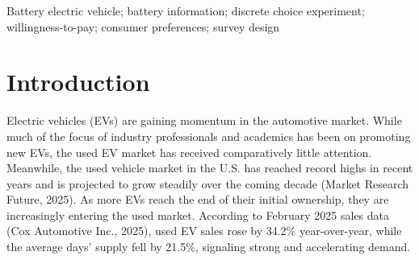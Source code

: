 \documentclass[a4paper,fleqn]{cas-sc}   %
\begin{document}
\begin{abstract}
This discrete choice experiment (DCE) aimed at understanding consumer preferences and willingness to pay for battery health information in the used battery electric vehicle (BEV) market. The potential survey design includes questions about current vehicle information, future vehicle preferences, a discrete choice experiment (DCE), EV knowledge, and demographics. The DCE systematically varies both standard vehicle attributes (e.g., price, mileage) and battery-specific features (e.g., state-of-health, refurbishment history) to quantify the economic value consumers place on battery-related information. Findings from this research project will improve the understanding of second-life battery markets, and guide future research in the evolving used EV landscape.

\end{abstract}


\begin{keywords}

Battery electric vehicle; battery information; discrete choice experiment; willingness-to-pay; consumer preferences;  survey design  
\end{keywords}

\maketitle
\renewcommand{\baselinestretch}{1}\normalsize
\section{Introduction}
\label{section:intro}

Electric vehicles (EVs)  are gaining momentum in the automotive market. While much of the focus of industry professionals and academics has been on promoting new EVs, the used EV market has received comparatively little attention. Meanwhile, the used vehicle market in the U.S. has reached record highs in recent years and is projected to grow steadily over the coming decade (Market Research Future, 2025). As more EVs reach the end of their initial ownership, they are increasingly entering the used market. According to February 2025 sales data (Cox Automotive Inc., 2025), used EV sales rose by 34.2\% year-over-year, while the average days' supply fell by 21.5\%, signaling strong and accelerating demand. 
\end{document}
